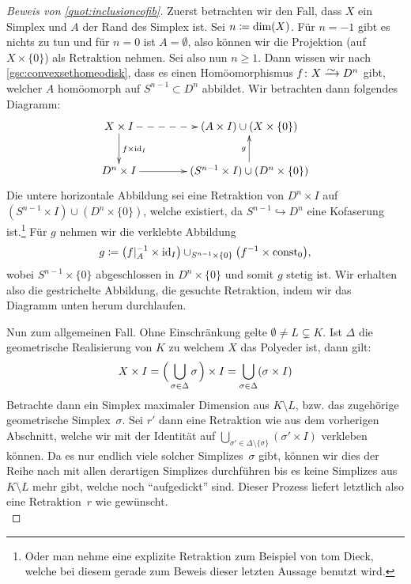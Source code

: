 \begin{proof}[Beweis von \cref{quot:inclusioncofib}]
    \pagebreak[2]
    Zuerst betrachten wir den Fall, dass $X$ ein Simplex und $A$ der Rand
    des Simplex ist. Sei $n\coloneqq\dim(X)$. Für $n=-1$ gibt es nichts zu tun und
    für $n=0$ ist $A=\emptyset$, also können wir die Projektion (auf
    $X\times\{0\}$) als Retraktion nehmen. Sei also nun $n\geq1$.
    Dann wissen wir nach \cref{gsc:convexsethomeodisk}, dass es
    einen Homöomorphismus 
    $f\colon X\xrightarrow{\smash{\raisebox{-2pt}{$\sim$}}} D^n$ 
    gibt, welcher $A$ homöomorph auf $S^{n-1}\subset D^n$ abbildet.
    Wir betrachten dann folgendes Diagramm:
    \begin{equation*}
        \begin{xy}
            \xymatrix@C=1.5cm{
                X\times I \ar@{-->}[r] \ar[d]^{f\times\id_I}
                & (A\times I)\cup(X\times\{0\})    
                \\
                D^n\times I \ar[r] 
                & (S^{n-1}\times I)\cup(D^n\times\{0\}) \ar[u]^g
            }
        \end{xy}
    \end{equation*}
    Die untere horizontale Abbildung sei eine Retraktion von $D^n\times I$ auf
    $(S^{n-1}\times I)\cup(D^n\times\{0\})$, welche existiert, da
    $S^{n-1}\hookrightarrow D^n$ eine Kofaserung ist.\footnote{%
        Oder man nehme eine explizite Retraktion zum Beispiel von
        tom Dieck\cite[Ch.\,2,.5]{bookc:tomdieck08}, welche bei diesem
        gerade zum Beweis dieser letzten Aussage benutzt wird.%
    }
    Für $g$ nehmen wir die
    verklebte Abbildung 
    \[ g \coloneqq \bigl(f\vert_A^{-1} \times\operatorname{id}_I\bigr) \cup_{S^{n-1}\times\{0\}}
        \bigl( f^{-1}\times\operatorname{const}_0 \bigr)
    , \]
    wobei $S^{n-1}\times\{0\}$ abgeschlossen in $D^n\times\{0\}$ und somit $g$
    stetig ist. Wir erhalten also die gestrichelte Abbildung, die gesuchte
    Retraktion, indem wir das Diagramm unten herum durchlaufen.

    Nun zum allgemeinen Fall. Ohne Einschränkung gelte 
    $\emptyset\neq L \subsetneq K$. Ist $\Delta$ die geometrische Realisierung
    von $K$ zu welchem $X$ das Polyeder ist, dann gilt:
    \[ X \times I 
        = \Bigl(\, \bigcup_{\sigma\in\Delta} \sigma \mkern2mu\Bigr) \times I
        = \bigcup_{\sigma\in\Delta} (\sigma\times I)
    \]
    Betrachte dann ein Simplex maximaler Dimension aus $K\setminus L$, bzw. das
    zugehörige geometrische Simplex~$\sigma$. Sei $r'$ dann eine Retraktion wie
    aus dem vorherigen Abschnitt, welche wir mit der Identität auf
    $\bigcup_{\sigma'\in\Delta\setminus\{\sigma\}} (\sigma'\times I)$ verkleben
    können. Da es nur endlich viele solcher Simplizes~$\sigma$ gibt, können wir
    dies der Reihe nach mit allen derartigen Simplizes durchführen bis es keine
    Simplizes aus $K\setminus L$ mehr gibt, welche noch \enquote{aufgedickt}
    sind. Dieser Prozess liefert letztlich also eine Retraktion~$r$ wie
    gewünscht.
    \\
\end{proof}
